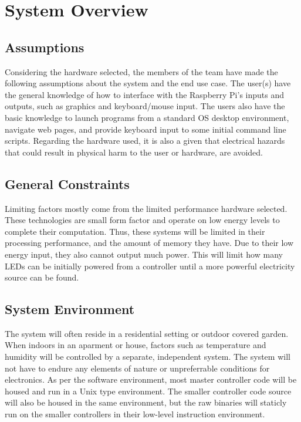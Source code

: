 \documentclass[onecolumn, draftclsnofoot,10pt, compsoc]{IEEEtran}
\begin{document}
	\section{System Overview}
		\subsection{Assumptions}
		Considering the hardware selected, the members of the team have made the following assumptions about the system and the end use case. The user(s) have
		the general knowledge of how to interface with the Raspberry Pi's inputs and outputs, such as graphics and keyboard/mouse input. The users also have the
		basic knowledge to launch programs from a standard OS desktop environment, navigate web pages, and provide keyboard input to some initial command line
		scripts. Regarding the hardware used, it is also a given that electrical hazards that could result in physical harm to the user or hardware, are avoided.

		\subsection{General Constraints}
		Limiting factors mostly come from the limited performance hardware selected. These technologies are small form factor and operate on low energy levels
		to complete their computation. Thus, these systems will be limited in their processing performance, and the amount of memory they have. Due to their
		low energy input, they also cannot output much power. This will limit how many LEDs can be initially powered from a controller until a more powerful
		electricity source can be found.

		\subsection{System Environment}
		The system will often reside in a residential setting or outdoor covered garden. When indoors in an aparment or house, factors such as temperature and
		humidity will be controlled by a separate, independent system. The system will not have to endure any elements of nature or unpreferrable conditions
		for electronics. As per the software environment, most master controller code will be housed and run in a Unix type environment. The smaller controller
		code source will also be housed in the same environment, but the raw binaries will staticly run on the smaller controllers in their low-level instruction
		environment.
\end{document}
